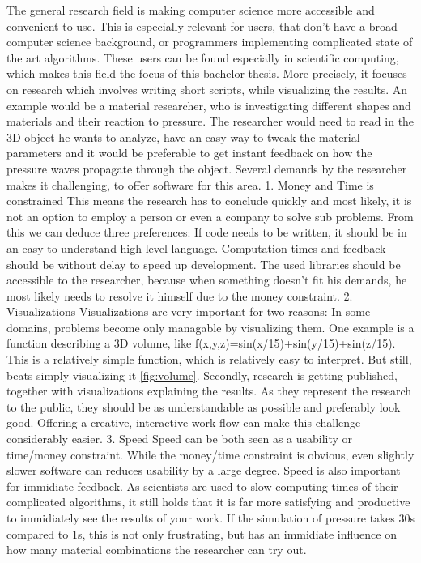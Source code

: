 The general research field is making computer science more accessible and convenient to use. This is especially relevant for users, that don't have a broad computer science background, or programmers implementing complicated state of the art algorithms.
These users can be found especially in scientific computing, which makes this field the focus of this bachelor thesis. 
More precisely, it focuses on research which involves writing short scripts, while visualizing the results. 
An example would be a material researcher, who is investigating different shapes and materials and their reaction to pressure.
The researcher would need to read in the 3D object he wants to analyze, have an easy way to tweak the material parameters and it would be preferable to get instant feedback on how the pressure waves propagate through the object. 
Several demands by the researcher makes it challenging, to offer software for this area.
1. Money and Time is constrained
This means the research has to conclude quickly and most likely, it is not an option to employ a person or even a company to solve sub problems.
From this we can deduce three preferences: If code needs to be written, it should be in an easy to understand high-level language. Computation times and feedback should be without delay to speed up development. The used libraries should be accessible to the researcher, because when something doesn't fit his demands, he most likely needs to resolve it himself due to the money constraint.
2. Visualizations
Visualizations are very important for two reasons:
In some domains, problems become only managable by visualizing them. One example is a function describing a 3D volume, like f(x,y,z)=sin(x/15)+sin(y/15)+sin(z/15). This is a relatively simple function, which is relatively easy to interpret. But still, beats simply visualizing it \ref{fig:volume}.
Secondly, research is getting published, together with visualizations explaining the results. As they represent the research to the public, they should be as understandable as possible and preferably look good.
Offering a creative, interactive work flow can make this challenge considerably easier.
3. Speed
Speed can be both seen as a usability or time/money constraint. While the money/time constraint is obvious, even slightly slower software can reduces usability by a large degree.
Speed is also important for immidiate feedback. As scientists are used to slow computing times of their complicated algorithms, it still holds that it is far more satisfying and productive to immidiately see the results of your work. If the simulation of pressure takes 30s compared to 1s, this is not only frustrating, but has an immidiate influence on how many material combinations the researcher can try out.


